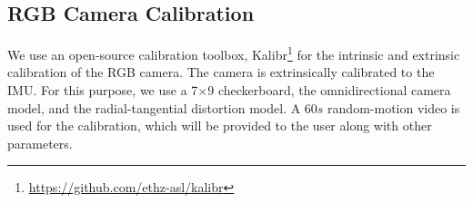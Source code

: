 \documentclass[10pt,twocolumn,letterpaper]{article}
\begin{document}

\subsection{RGB Camera Calibration}

We use an open-source calibration toolbox, Kalibr\footnote{\href{https://github.com/ethz-asl/kalibr}{https://github.com/ethz-asl/kalibr}} for the intrinsic and extrinsic calibration of the RGB camera. The camera is extrinsically calibrated to the IMU. For this purpose, we use a 7$\times$9 checkerboard, the omnidirectional camera model, and the radial-tangential distortion model. A $60s$ random-motion video is used for the calibration, which will be provided to the user along with other parameters.





\end{document}
